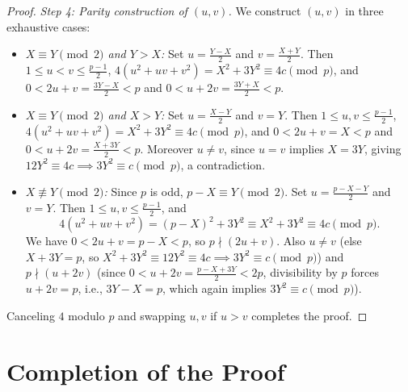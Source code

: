 \documentclass[11pt,reqno]{amsart}
\theoremstyle{remark}
\begin{document}
\begin{proof}
\emph{Step 4: Parity construction of $(u, v)$.}
We construct $(u, v)$ in three exhaustive cases:
\begin{itemize}
\item \emph{$X \equiv Y \pmod 2$ and $Y > X$:} Set $u = \frac{Y - X}{2}$ and $v = \frac{X + Y}{2}$. Then $1 \le u < v \le \frac{p-1}{2}$, $4(u^2 + uv + v^2) = X^2 + 3Y^2 \equiv 4c \pmod p$, and $0 < 2u + v = \frac{3Y - X}{2} < p$ and $0 < u + 2v = \frac{3Y + X}{2} < p$.
\item \emph{$X \equiv Y \pmod 2$ and $X > Y$:} Set $u = \frac{X - Y}{2}$ and $v = Y$. Then $1 \le u, v \le \frac{p-1}{2}$, $4(u^2 + uv + v^2) = X^2 + 3Y^2 \equiv 4c \pmod p$, and $0 < 2u + v = X < p$ and $0 < u + 2v = \frac{X + 3Y}{2} < p$. Moreover $u \neq v$, since $u = v$ implies $X = 3Y$, giving $12Y^2 \equiv 4c \implies 3Y^2 \equiv c \pmod p$, a contradiction.
\item \emph{$X \not\equiv Y \pmod 2$:} Since $p$ is odd, $p - X \equiv Y \pmod 2$. Set $u = \frac{p - X - Y}{2}$ and $v = Y$. Then $1 \le u, v \le \frac{p-1}{2}$, and
\[
4(u^2 + uv + v^2) = (p - X)^2 + 3Y^2 \equiv X^2 + 3Y^2 \equiv 4c \pmod p.
\]
We have $0 < 2u + v = p - X < p$, so $p \nmid (2u + v)$. Also $u \neq v$ (else $X + 3Y = p$, so $X^2 + 3Y^2 \equiv 12Y^2 \equiv 4c \implies 3Y^2 \equiv c \pmod p$) and $p \nmid (u + 2v)$ (since $0 < u + 2v = \frac{p - X + 3Y}{2} < 2p$, divisibility by $p$ forces $u + 2v = p$, i.e., $3Y - X = p$, which again implies $3Y^2 \equiv c \pmod p$).
\end{itemize}
Canceling $4$ modulo $p$ and swapping $u, v$ if $u > v$ completes the proof.
\end{proof}

\section{Completion of the Proof}
\end{document}
